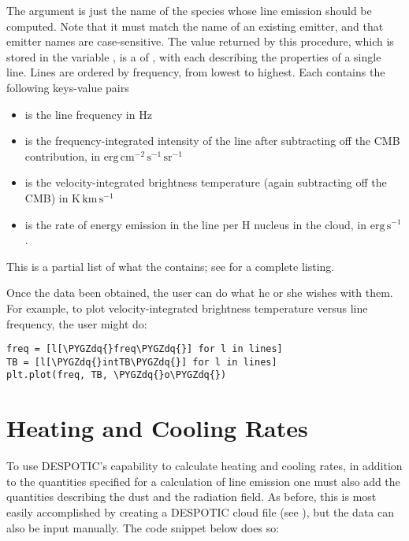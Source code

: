 \documentclass[letterpaper,10pt,english]{sphinxmanual}
\def\PYGZdq{\char`\"}
\begin{document}
The argument is just the name of the species whose line emission
should be computed. Note that it must match the name of an existing
emitter, and that emitter names are case-sensitive. The value returned
by this procedure, which is stored in the variable , is a
 of , with each  describing the properties of
a single line. Lines are ordered by frequency, from lowest to
highest. Each  contains the following keys-value pairs
\begin{itemize}
\item {} 
 is the line frequency in Hz

\item {} 
 is the frequency-integrated intensity of the line
after subtracting off the CMB contribution, in
\(\mathrm{erg}\,\mathrm{cm}^{-2}\,\mathrm{s}^{-1}\,\mathrm{sr}^{-1}\)

\item {} 
 is the velocity-integrated brightness temperature (again
subtracting off the CMB) in
\(\mathrm{K}\,\mathrm{km}\,\mathrm{s}^{-1}\)

\item {} 
 is the rate of energy emission in the line per H nucleus
in the cloud, in \(\mathrm{erg}\,\mathrm{s}^{-1}\).

\end{itemize}

This is a partial list of what the  contains; see
{\hyperref[fulldoc:sssec\string-full\string-cloud]{}} for a complete listing.

Once the data been obtained, the user can do what he or she wishes
with them. For example, to plot velocity-integrated brightness
temperature versus line frequency, the user might do:

\begin{Verbatim}[commandchars=\\\{\}]
freq = [l[\PYGZdq{}freq\PYGZdq{}] for l in lines]
TB = [l[\PYGZdq{}intTB\PYGZdq{}] for l in lines]
plt.plot(freq, TB, \PYGZdq{}o\PYGZdq{})
\end{Verbatim}


\section{Heating and Cooling Rates}
\label{functions:heating-and-cooling-rates}
To use DESPOTIC's capability to calculate heating and cooling rates,
in addition to the quantities specified for a calculation of line
emission one must also add the quantities describing the dust and the
radiation field. As before, this is most easily accomplished by
creating a DESPOTIC cloud file (see {\hyperref[cloudfiles:sec\string-cloudfiles]{}}), but the
data can also be input manually. The code snippet below does so:
\end{document}
